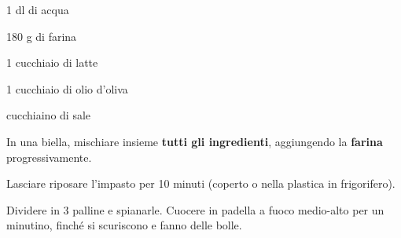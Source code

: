 \newpage
{}


\begin{ingredients}
	\item 1 dl di acqua
	\item 180 g di farina
	\item 1 cucchiaio di latte
	\item 1 cucchiaio di olio d'oliva
	\item {} cucchiaino di sale
\end{ingredients}


\medskip

In una biella, mischiare insieme \textbf{tutti gli ingredienti}, aggiungendo la \textbf{farina} progressivamente. 

Lasciare riposare l'impasto per 10 minuti (coperto o nella plastica in frigorifero).

Dividere in 3 palline e spianarle. Cuocere in padella a fuoco medio-alto per un minutino, finché si scuriscono e fanno delle bolle. 


\vspace*{0.75 cm}

\begin{recipeblock}
	
\end{recipeblock}